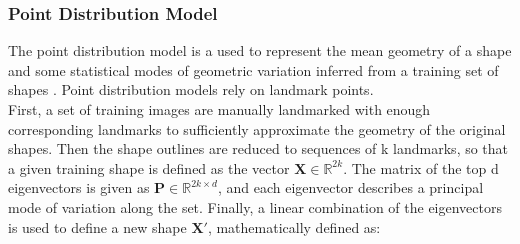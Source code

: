 \subsubsection{Point Distribution Model}
The point distribution model is a used to represent the mean geometry of a shape and some statistical modes of geometric variation inferred from a training set of shapes \cite{wiki:PDM}. Point distribution models rely on landmark points. \\
First, a set of training images are manually landmarked with enough corresponding landmarks to sufficiently approximate the geometry of the original shapes.
Then the shape outlines are reduced to sequences of k landmarks, so that a given training shape is defined as the vector $\mathbf {X} \in \mathbb {R} ^{2k}$.
 The matrix of the top d eigenvectors is given as $\mathbf {P} \in \mathbb {R} ^{2k\times d}$, and each eigenvector describes a principal mode of variation along the set.
 Finally, a linear combination of the eigenvectors is used to define a new shape $ \mathbf {X} '$, mathematically defined as:
 
